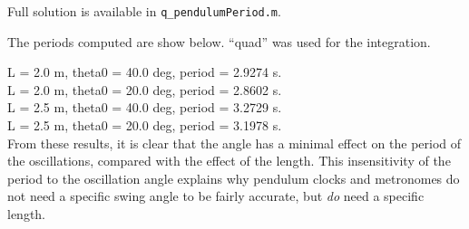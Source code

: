 
\begin{Solution} 
 Full solution is available in \verb#q_pendulumPeriod.m#.

  The periods computed are show below.  ``quad'' was used for the
  integration.

L = 2.0 m, theta0 = 40.0 deg, period = 2.9274 s. \\
L = 2.0 m, theta0 = 20.0 deg, period = 2.8602 s. \\
L = 2.5 m, theta0 = 40.0 deg, period = 3.2729 s. \\
L = 2.5 m, theta0 = 20.0 deg, period = 3.1978 s. \\

From these results, it is clear that the angle has a minimal effect on
the period of the oscillations, compared with the effect of the
length.  This insensitivity of the period to the oscillation angle
explains why pendulum clocks and metronomes do not need a specific
swing angle to be fairly accurate, but {\em do} need a specific
length.
\end{Solution} 


\item
\begin{Question}
    
\end{Question}

\begin{Solution}
    
\end{Solution}






